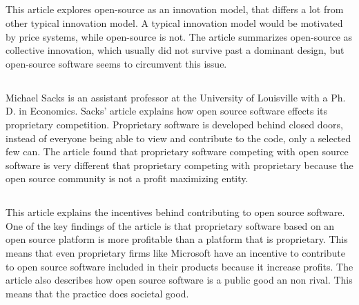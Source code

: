 \documentclass[12pt,letterpaper]{article}
\begin{document}
\subsection*{}
This article explores open-source as an innovation model, that differs a lot from other typical innovation model. A typical innovation model would be motivated by price systems, while open-source is not. The article summarizes open-source as collective innovation, which usually did not survive past a dominant design, but open-source software seems to circumvent this issue.

\subsection*{}
Michael Sacks is an assistant professor at the University of Louisville with a Ph. D. in Economics. Sacks' article explains how open source software effects its proprietary competition. Proprietary software is developed behind closed doors, instead of everyone being able to view and contribute to the code, only a selected few can. The article found that proprietary software competing with open source software is very different that proprietary competing with proprietary because the open source community is not a profit maximizing entity.

\subsection*{}
This article explains the incentives behind contributing to open source software. One of the key findings of the article is that proprietary software based on an open source platform is more profitable than a platform that is proprietary. This means that even proprietary firms like Microsoft have an incentive to contribute to open source software included in their products because it increase profits. The article also describes how open source software is a public good an non rival. This means that the practice does societal good.

 
\end{document}
